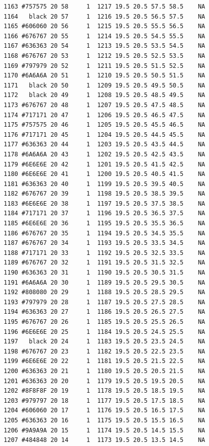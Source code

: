 \documentclass[12pt,twoside]{reedthesis}
\begin{document}
\begin{verbatim}
  1163 #757575 20 58     1  1217 19.5 20.5 57.5 58.5    NA
  1164   black 20 57     1  1216 19.5 20.5 56.5 57.5    NA
  1165 #606060 20 56     1  1215 19.5 20.5 55.5 56.5    NA
  1166 #676767 20 55     1  1214 19.5 20.5 54.5 55.5    NA
  1167 #636363 20 54     1  1213 19.5 20.5 53.5 54.5    NA
  1168 #676767 20 53     1  1212 19.5 20.5 52.5 53.5    NA
  1169 #797979 20 52     1  1211 19.5 20.5 51.5 52.5    NA
  1170 #6A6A6A 20 51     1  1210 19.5 20.5 50.5 51.5    NA
  1171   black 20 50     1  1209 19.5 20.5 49.5 50.5    NA
  1172   black 20 49     1  1208 19.5 20.5 48.5 49.5    NA
  1173 #676767 20 48     1  1207 19.5 20.5 47.5 48.5    NA
  1174 #717171 20 47     1  1206 19.5 20.5 46.5 47.5    NA
  1175 #757575 20 46     1  1205 19.5 20.5 45.5 46.5    NA
  1176 #717171 20 45     1  1204 19.5 20.5 44.5 45.5    NA
  1177 #636363 20 44     1  1203 19.5 20.5 43.5 44.5    NA
  1178 #6A6A6A 20 43     1  1202 19.5 20.5 42.5 43.5    NA
  1179 #6E6E6E 20 42     1  1201 19.5 20.5 41.5 42.5    NA
  1180 #6E6E6E 20 41     1  1200 19.5 20.5 40.5 41.5    NA
  1181 #636363 20 40     1  1199 19.5 20.5 39.5 40.5    NA
  1182 #676767 20 39     1  1198 19.5 20.5 38.5 39.5    NA
  1183 #6E6E6E 20 38     1  1197 19.5 20.5 37.5 38.5    NA
  1184 #717171 20 37     1  1196 19.5 20.5 36.5 37.5    NA
  1185 #6E6E6E 20 36     1  1195 19.5 20.5 35.5 36.5    NA
  1186 #676767 20 35     1  1194 19.5 20.5 34.5 35.5    NA
  1187 #676767 20 34     1  1193 19.5 20.5 33.5 34.5    NA
  1188 #717171 20 33     1  1192 19.5 20.5 32.5 33.5    NA
  1189 #676767 20 32     1  1191 19.5 20.5 31.5 32.5    NA
  1190 #636363 20 31     1  1190 19.5 20.5 30.5 31.5    NA
  1191 #6A6A6A 20 30     1  1189 19.5 20.5 29.5 30.5    NA
  1192 #808080 20 29     1  1188 19.5 20.5 28.5 29.5    NA
  1193 #797979 20 28     1  1187 19.5 20.5 27.5 28.5    NA
  1194 #636363 20 27     1  1186 19.5 20.5 26.5 27.5    NA
  1195 #676767 20 26     1  1185 19.5 20.5 25.5 26.5    NA
  1196 #6E6E6E 20 25     1  1184 19.5 20.5 24.5 25.5    NA
  1197   black 20 24     1  1183 19.5 20.5 23.5 24.5    NA
  1198 #676767 20 23     1  1182 19.5 20.5 22.5 23.5    NA
  1199 #6E6E6E 20 22     1  1181 19.5 20.5 21.5 22.5    NA
  1200 #636363 20 21     1  1180 19.5 20.5 20.5 21.5    NA
  1201 #636363 20 20     1  1179 19.5 20.5 19.5 20.5    NA
  1202 #8F8F8F 20 19     1  1178 19.5 20.5 18.5 19.5    NA
  1203 #979797 20 18     1  1177 19.5 20.5 17.5 18.5    NA
  1204 #606060 20 17     1  1176 19.5 20.5 16.5 17.5    NA
  1205 #636363 20 16     1  1175 19.5 20.5 15.5 16.5    NA
  1206 #9A9A9A 20 15     1  1174 19.5 20.5 14.5 15.5    NA
  1207 #484848 20 14     1  1173 19.5 20.5 13.5 14.5    NA

\end{verbatim}
\end{document}
